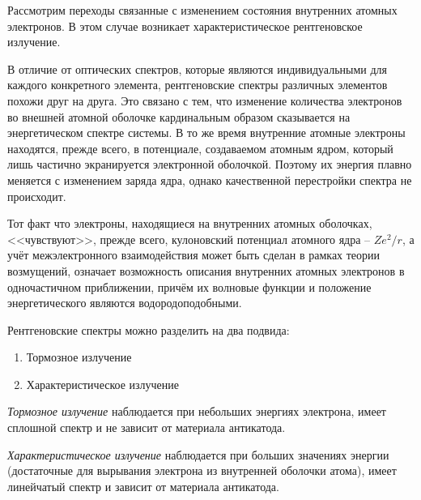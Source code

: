 
Рассмотрим переходы связанные с изменением состояния внутренних атомных 
электронов. В этом случае возникает характеристическое рентгеновское 
излучение. 

В отличие от оптических спектров, которые являются индивидуальными для 
каждого конкретного элемента, рентгеновские спектры различных элементов 
похожи друг на друга. Это связано с тем, что изменение количества 
электронов во внешней атомной оболочке кардинальным образом сказывается на 
энергетическом спектре системы. В то же время внутренние атомные электроны 
находятся, прежде всего, в потенциале, создаваемом атомным ядром, который 
лишь частично экранируется электронной оболочкой. Поэтому их энергия 
плавно меняется с изменением заряда ядра, однако качественной перестройки 
спектра не происходит.

Тот факт что электроны, находящиеся на внутренних атомных оболочках, 
<<чувствуют>>, прежде всего, кулоновский потенциал атомного ядра -- 
\( Ze^2 / r \), а учёт межэлектронного взаимодействия может быть сделан в 
рамках теории возмущений, означает возможность описания внутренних атомных 
электронов в одночастичном приближении, причём их волновые функции и 
положение энергетического являются водородоподобными.

Рентгеновские спектры можно разделить на два подвида:
\begin{enumerate}
	\item Тормозное излучение
	\item Характеристическое излучение
\end{enumerate}

\emph{Тормозное излучение} наблюдается при небольших энергиях электрона, 
имеет сплошной спектр и не зависит от материала антикатода.

\emph{Характеристическое излучение} наблюдается при больших значениях 
энергии (достаточные для вырывания электрона из внутренней оболочки атома), 
имеет линейчатый спектр и зависит от материала антикатода. 

